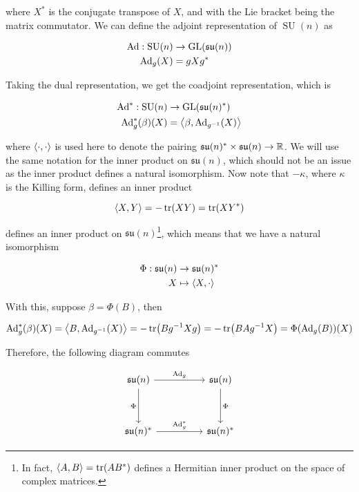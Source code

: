 \documentclass{article}
\DeclareMathOperator{\SU}{SU}
\newcommand{\su}{\mathfrak{su}}
\begin{document}
where \(X^*\) is the conjugate transpose of \(X\), and with the Lie bracket being the matrix commutator. We can define the adjoint representation of \(\SU(n)\) as

\begin{align*}
    \Ad : \SU(n) &\to \GL(\su(n)) \\
    \Ad_g(X) &= gXg^*
\end{align*}

Taking the dual representation, we get the coadjoint representation, which is

\begin{align*}
    \Ad^* : \SU(n) &\to \GL(\su(n)^*) \\
    \Ad^*_g(\beta)(X) &= \inner{\beta, \Ad_{g^{-1}}(X)}
\end{align*}

where \(\left\langle \cdot, \cdot \right\rangle\) is used here to denote the pairing \(\su(n)^* \times \su(n) \to \R\). We will use the same notation for the inner product on \(\su(n)\), which should not be an issue as the inner product defines a natural isomorphism. Now note that \(-\kappa\), where \(\kappa\) is the Killing form, defines an inner product

\[\left\langle X, Y \right\rangle = -\tr(XY) = \tr(XY^*)\]

defines an inner product on \(\su(n)\)\footnote{In fact, \(\left\langle A, B \right\rangle = \tr(AB^*)\) defines a Hermitian inner product on the space of complex matrices.}, which means that we have a natural isomorphism

\begin{align*}
    \Phi : \su(n) &\to \su(n)^* \\
    X &\mapsto \inner{X, \cdot}
\end{align*}

With this, suppose \(\beta = \Phi(B)\), then

\[\operatorname{Ad}_g^*(\beta)(X) = \left\langle B, \operatorname{Ad}_{g^{-1}}(X) \right\rangle = -\tr(Bg^{-1}Xg) = -\tr(BAg^{-1}X) = \Phi(\operatorname{Ad}_g(B))(X)\]

Therefore, the following diagram commutes

\[\begin{tikzcd}
	{\su(n)} && {\su(n)} \\
	\\
	{\su(n)^*} && {\su(n)^*}
	\arrow["{\Ad_g^*}", from=3-1, to=3-3]
	\arrow["{\Ad_g}", from=1-1, to=1-3]
	\arrow["\Phi"', from=1-1, to=3-1]
	\arrow["\Phi", from=1-3, to=3-3]
\end{tikzcd}\]
\end{document}
